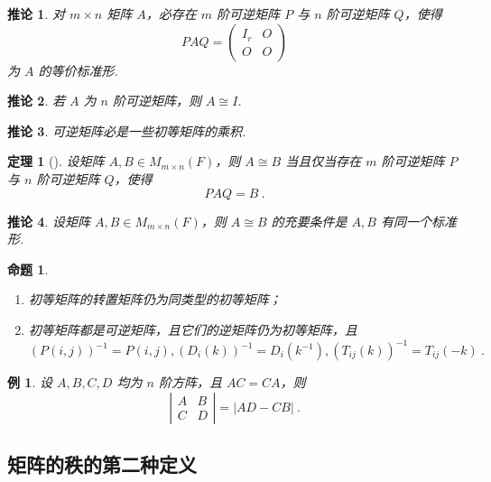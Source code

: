 \documentclass[zihao=-4,UTF8,linespread=1.8,nothm]{aytony_base}
\newtheorem{theorem}{\indent 定理}[subsection]
\newtheorem{proposition}{\indent 命题}[subsection]
\newtheorem*{corollary}{\indent 推论}
\newtheorem{example}{\indent 例}[subsection]
\begin{document}
\begin{corollary}
    对 $m \times n$ 矩阵 $A$，必存在 $m$ 阶可逆矩阵 $P$ 与 $n$ 阶可逆矩阵 $Q$，使得 $$
        PAQ = \left(
        \begin{matrix}
            I_r & O \\
            O   & O
        \end{matrix}
        \right)
    $$ 为 $A$ 的等价标准形.
\end{corollary}

\begin{corollary}
    若 $A$ 为 $n$ 阶可逆矩阵，则 $A \cong I$.
\end{corollary}

\begin{corollary}
    可逆矩阵必是一些初等矩阵的乘积.
\end{corollary}

\begin{theorem}[]
    设矩阵 $A, B \in M_{m \times n}(F)$，则 $A \cong B$ 当且仅当存在 $m$ 阶可逆矩阵 $P$ 与 $n$ 阶可逆矩阵 $Q$，使得 $$
        PAQ = B\ .
    $$
\end{theorem}

\begin{corollary}
    设矩阵 $A, B \in M_{m \times n}(F)$，则 $A \cong B$ 的充要条件是 $A, B$ 有同一个标准形.
\end{corollary}

\begin{proposition}
    \begin{enumerate}[nosep]
        \item 初等矩阵的转置矩阵仍为同类型的初等矩阵；
        \item 初等矩阵都是可逆矩阵，且它们的逆矩阵仍为初等矩阵，且 $$
                  (P(i, j))^{-1} = P({i, j}), (D_i(k))^{-1} = D_i(k^{-1}), (T_{ij}(k))^{-1} = T_{ij}(-k)\ .
              $$
    \end{enumerate}
\end{proposition}

\setcounter{example}{3}
\begin{example}
    设 $A, B, C, D$ 均为 $n$ 阶方阵，且 $AC = CA$，则 $$
        \left|
        \begin{matrix}
            A & B \\
            C & D
        \end{matrix}
        \right| = |AD - CB|\ .
    $$
\end{example}

\subsection{矩阵的秩的第二种定义}
\end{document}
